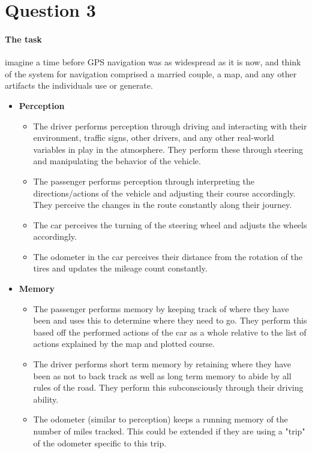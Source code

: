 \section{Question 3}

\paragraph{The task} imagine a time before GPS navigation was as widespread as it is now, and think of the system for navigation comprised a married couple, a map, and any other artifacts the individuals use or generate.

\begin{itemize}
\item
  \textbf{Perception}
  \begin{itemize}
  \item
    The driver performs perception through driving and interacting with their environment, traffic signs, other drivers, and any other real-world variables in play in the atmosphere. They perform these through steering and manipulating the behavior of the vehicle.
  \item
    The passenger performs perception through interpreting the directions/actions of the vehicle and adjusting their course accordingly. They perceive the changes in the route constantly along their journey.
  \item
    The car perceives the turning of the steering wheel and adjusts the wheels accordingly.
  \item
    The odometer in the car perceives their distance from the rotation of the tires and updates the mileage count constantly.
  \end{itemize}
\item
  \textbf{Memory}
  \begin{itemize}
  \item
    The passenger performs memory by keeping track of where they have been and uses this to determine where they need to go. They perform this based off the performed actions of the car as a whole relative to the list of actions explained by the map and plotted course.
  \item
    The driver performs short term memory by retaining where they have been as not to back track as well as long term memory to abide by all rules of the road. They perform this subconsciously through their driving ability.
  \item
    The odometer (similar to perception) keeps a running memory of the number of miles tracked. This could be extended if they are using a "trip" of the odometer specific to this trip.

\end{itemize}
\end{itemize}
